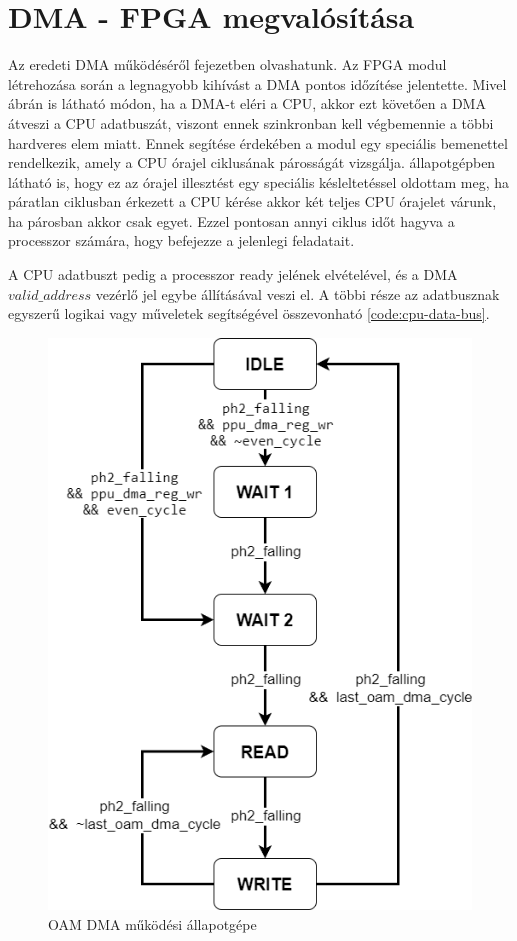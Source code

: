 
\section{DMA - FPGA megvalósítása}

Az eredeti DMA működéséről  fejezetben olvashatunk. Az FPGA modul létrehozása során a legnagyobb kihívást a DMA pontos időzítése jelentette. Mivel  ábrán is látható módon, ha a DMA-t eléri a CPU, akkor ezt követően a DMA átveszi a CPU adatbuszát, viszont ennek szinkronban kell végbemennie a többi hardveres elem miatt. Ennek segítése érdekében a modul egy speciális bemenettel rendelkezik, amely a CPU órajel ciklusának párosságát vizsgálja.  állapotgépben látható is, hogy ez az órajel illesztést egy speciális késleltetéssel oldottam meg, ha páratlan ciklusban érkezett a CPU kérése akkor két teljes CPU órajelet várunk, ha párosban akkor csak egyet. Ezzel pontosan annyi ciklus időt hagyva a processzor számára, hogy befejezze a jelenlegi feladatait.

A CPU adatbuszt pedig a processzor ready jelének elvételével, és a DMA $valid\_address$ vezérlő jel egybe állításával veszi el. A többi része az adatbusznak egyszerű logikai vagy műveletek segítségével összevonható \ref{code:cpu-data-bus}. 

\begin{figure}[H]
\centering
\includegraphics[width=120mm, keepaspectratio]{figures/sprite-dma-FSM}
\caption{OAM DMA működési állapotgépe} 
\label{fig:sprite-dma-FSM}
\end{figure}

